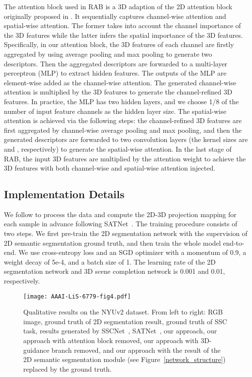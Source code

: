 \documentclass[letterpaper]{article} \usepackage{aaai20}  \usepackage{times}  \usepackage{helvet} \usepackage{courier}  \usepackage[hyphens]{url}  \usepackage{graphicx} \urlstyle{rm} \def\UrlFont{\rm}  \usepackage{graphicx}  \frenchspacing  \setlength{\pdfpagewidth}{8.5in}  \setlength{\pdfpageheight}{11in}
\begin{document}
The attention block used in RAB is a 3D adaption of the 2D attention block originally proposed in \cite{Woo2018CBAMCB}. It sequentially captures channel-wise attention and spatial-wise attention. The former takes into account the channel importance of the 3D features while the latter infers the spatial importance of the 3D features. Specifically, in our attention block, the 3D features of each channel are firstly aggregated by using average pooling and max pooling to generate two descriptors. Then the aggregated descriptors are forwarded to a multi-layer perceptron (MLP) to extract hidden features. The outputs of the MLP are element-wise added as the channel-wise attention. The generated channel-wise attention is multiplied by the 3D features to generate the channel-refined 3D features. 
In practice, the MLP has two hidden layers, and we choose 1/8 of the number of input feature channels as the hidden layer size. The spatial-wise attention is achieved via the following steps: the channel-refined 3D features are first aggregated by channel-wise average pooling and max pooling, and then the generated descriptors are forwarded to two convolution layers (the kernel sizes are  and , respectively) to generate the spatial-wise attention. In the last stage of RAB, the input 3D features are multiplied by the attention weight to achieve the 3D features with both channel-wise and spatial-wise attention injected. 


\subsection{Implementation Details}
\label{details}
We follow \cite{Song2016SemanticSC} to process the data and compute the 2D-3D projection mapping for each sample in advance following SATNet~\cite{Liu2018SeeAT}. The training procedure consists of two steps. We first pre-train the 2D segmentation network with the supervision of 2D semantic segmentation ground truth, and then train the whole model end-to-end. We use cross-entropy loss and an SGD optimizer with a momentum of 0.9, a weight decay of 5e-4, and a batch size of 1. The learning rate of the 2D segmentation network and 3D scene completion network is 0.001 and 0.01, respectively. 

\begin{figure*}[t]
\centering
\texttt{[image: AAAI-LiS-6779-fig4.pdf]}
\caption{Qualitative results on the NYUv2 dataset. From left to right: RGB image, ground truth of 2D segmentation result, ground truth of SSC task, results generated by SSCNet~\cite{Song2016SemanticSC}, SATNet~\cite{Liu2018SeeAT}, our approach, our approach with attention block removed, our approach with 3D-guidance branch removed, and our approach
with the result of the 2D semantic segmentation module (see Figure~\ref{network_structure}) replaced by the ground truth.}
\label{visualization}
\end{figure*}
\end{document}
